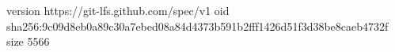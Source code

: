 version https://git-lfs.github.com/spec/v1
oid sha256:9c09d8eb0a89c30a7ebed08a84d4373b591b2fff1426d51f3d38be8caeb4732f
size 5566

